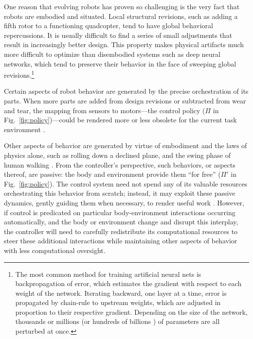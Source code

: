 One reason that evolving robots 
has proven so challenging is the very fact that robots are embodied and situated.
Local structural revisions, such as adding a fifth rotor to a functioning quadcopter, tend to have global behavioral repercussions.
It is usually difficult to find a series of small adjustments that result in increasingly better design. 
This property makes physical artifacts much more difficult to optimize than disembodied systems such as deep neural networks, which tend to preserve their behavior in the face of sweeping global revisions.\footnote{%
The most common method for training artificial neural nets is backpropagation of error, which
estimates the gradient with respect to each weight of the network.
Iterating backward, one layer at a time, error is propagated by chain-rule to upstream weights, which are adjusted in proportion to their respective gradient.
Depending on the size of the network, thousands or millions (or hundreds of billions \cite{rajbhandari2019zero}) of parameters are all perturbed at once.%
}

Certain aspects of robot behavior are generated by the precise orchestration of its parts.
When more parts are added from design revisions or subtracted from wear and tear, 
the mapping from sensors to motors---the control policy ($\Pi$ in Fig.~\ref{fig:policy})---could be rendered more or less obsolete for the current task environment \cite{bongard2006resilient,cully2015robots}.

Other aspects of behavior are generated by virtue of embodiment and the laws of physics alone, such as rolling down a declined plane, and the swing phase of human walking \cite{Collins1082}.
From the controller's perspective, such behaviors, or aspects thereof, are passive: the body and environment provide them ``for free'' ($\Pi'$ in Fig.~\ref{fig:policy}).
The control system need not spend any of its valuable resources orchestrating this behavior from scratch; instead, it may exploit these passive dynamics, gently guiding them when necessary, to render useful work \cite{vaughan2004evolution}.
However, if control is predicated on particular body-environment interactions occurring automatically, 
and the body or environment change and disrupt this interplay,
the controller will need to carefully redistribute its computational resources to steer these additional interactions while maintaining other aspects of behavior with less computational oversight.

